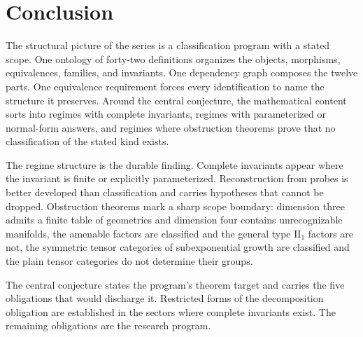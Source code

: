 \documentclass[11pt,letterpaper]{article}
\theoremstyle{definition}
\theoremstyle{remark}
\begin{document}
\section{Conclusion}

The structural picture of the series is a classification program with a stated scope. One ontology of forty-two definitions organizes the objects, morphisms, equivalences, families, and invariants. One dependency graph composes the twelve parts. One equivalence requirement forces every identification to name the structure it preserves. Around the central conjecture, the mathematical content sorts into regimes with complete invariants, regimes with parameterized or normal-form answers, and regimes where obstruction theorems prove that no classification of the stated kind exists.

The regime structure is the durable finding. Complete invariants appear where the invariant is finite or explicitly parameterized. Reconstruction from probes is better developed than classification and carries hypotheses that cannot be dropped. Obstruction theorems mark a sharp scope boundary: dimension three admits a finite table of geometries and dimension four contains unrecognizable manifolds, the amenable factors are classified and the general type $\mathrm{II}_1$ factors are not, the symmetric tensor categories of subexponential growth are classified and the plain tensor categories do not determine their groups.

The central conjecture states the program's theorem target and carries the five obligations that would discharge it. Restricted forms of the decomposition obligation are established in the sectors where complete invariants exist. The remaining obligations are the research program.
\end{document}
